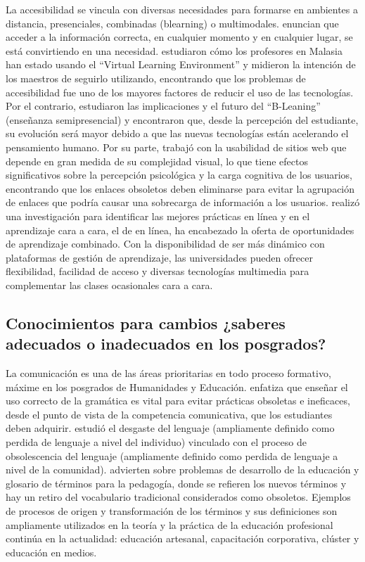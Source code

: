 \documentclass[spanish]{textolivre}
\begin{document}
La accesibilidad se vincula con diversas necesidades para formarse en ambientes a distancia, presenciales, combinadas (blearning) o multimodales. \textcite{guabassi_personalized_2018} enuncian que acceder a la información correcta, en cualquier momento y en cualquier lugar, se está convirtiendo en una necesidad. \textcite{awang_teachers_2018} estudiaron cómo los profesores en Malasia han estado usando el “Virtual Learning Environment” y midieron la intención de los maestros de seguirlo utilizando, encontrando que los problemas de accesibilidad fue uno de los mayores factores de reducir el uso de las tecnologías. Por el contrario, \textcite{dziuban_blended_2018} estudiaron las implicaciones y el futuro del “B-Leaning” (enseñanza semipresencial) y encontraron que, desde la percepción del estudiante, su evolución será mayor debido a que las nuevas tecnologías están acelerando el pensamiento humano. Por su parte, \textcite{chen_improving_2018} trabajó con la usabilidad de sitios web que depende en gran medida de su complejidad visual, lo que tiene efectos significativos sobre la percepción psicológica y la carga cognitiva de los usuarios, encontrando que los enlaces obsoletos deben eliminarse para evitar la agrupación de enlaces que podría causar una sobrecarga de información a los usuarios. \textcite{skiba_horizon_2017} realizó una investigación para identificar las mejores prácticas en línea y en el aprendizaje cara a cara, el de en línea, ha encabezado la oferta de oportunidades de aprendizaje combinado. Con la disponibilidad de ser más dinámico con plataformas de gestión de aprendizaje, las universidades pueden ofrecer flexibilidad, facilidad de acceso y diversas tecnologías multimedia para complementar las clases ocasionales cara a cara.

\subsection{Conocimientos para cambios ¿saberes adecuados o inadecuados en los posgrados?}\label{sec-formato}
La comunicación es una de las áreas prioritarias en todo proceso formativo, máxime en los posgrados de Humanidades y Educación. \textcite{cano_vela_ensenar_2017} enfatiza que enseñar el uso correcto de la gramática es vital para evitar prácticas obsoletas e ineficaces, desde el punto de vista de la competencia comunicativa, que los estudiantes deben adquirir. \textcite{jones_does_2018} estudió el desgaste del lenguaje (ampliamente definido como perdida de lenguaje a nivel del individuo) vinculado con el proceso de obsolescencia del lenguaje (ampliamente definido como perdida de lenguaje a nivel de la comunidad). \textcite{gudilina_transformation_2017} advierten sobre problemas de desarrollo de la educación y glosario de términos para la pedagogía, donde se refieren los nuevos términos y hay un retiro del vocabulario tradicional considerados como obsoletos. Ejemplos de procesos de origen y transformación de los términos y sus definiciones son ampliamente utilizados en la teoría y la práctica de la educación profesional continúa en la actualidad: educación artesanal, capacitación corporativa, clúster y educación en medios.
\end{document}
